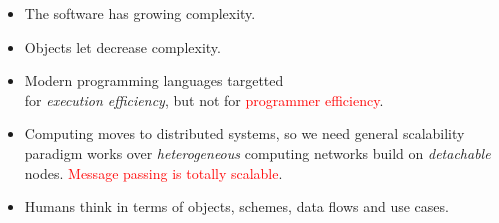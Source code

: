 
\begin{itemize}
  \item 
The software has growing complexity.
  \item 
Objects let decrease complexity.
  \item 
Modern programming languages targetted\\for \emph{execution efficiency},
but not for \textcolor{red}{programmer efficiency}.
  \item 
Computing moves to distributed systems, so we need general scalability paradigm
works over \emph{heterogeneous} computing networks build on \emph{detachable}
nodes. \textcolor{red}{Message passing is totally scalable}.
  \item 
Humans think in terms of objects, schemes, data flows and use cases.
\end{itemize}
